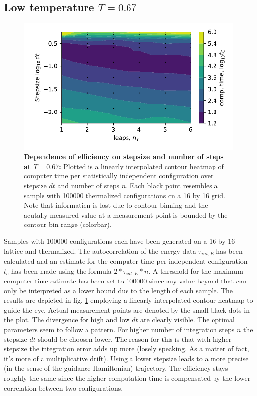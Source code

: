 \documentclass[11pt, a4paper]{scrartcl}
\begin{document}
\subsection{Low temperature $T = 0.67$}
    \begin{figure}
    \begin{centering}
        \includegraphics{low_T.pdf}
        \caption{\textbf{Dependence of efficiency on stepsize and number of steps at $T = 0.67$: } Plotted is a linearly interpolated contour heatmap of computer time per statistically independent configuration over stepsize $dt$ and number of steps $n$. Each black point resembles a sample with 100000 thermalized configurations on a 16 by 16 grid. Note that information is lost due to contour binning and the acutally measured value at a measurement point is bounded by the contour bin range (colorbar).}
    \end{centering}
    \label{lowT}
    \end{figure}
    Samples with 100000 configurations each have been generated on a 16 by 16 lattice and thermalized. The autocorrelation of the energy data $\tau_{int, E}$ has been calculated and an estimate for the computer time per independent configuration $t_c$ has been made using the formula $2*\tau_{int, E} * n$. A threshold for the maximum computer time estimate has been set to 100000 since any value beyond that can only be interpreted as a lower bound due to the length of each sample. The results are depicted in fig. \ref{lowT} employing a linearly interpolated contour heatmap to guide the eye. Actual measurement points are denoted by the small black dots in the plot. The divergence for high and low $dt$ are clearly visible. The optimal parameters seem to follow a pattern. For higher number of integration steps $n$ the stepsize $dt$ should be choosen lower. The reason for this is that with higher stepsize the integration error adds up more (losely speaking. As a matter of fact, it's more of a multiplicative drift). Using a lower stepsize leads to a more precise (in the sense of the guidance Hamiltonian) trajectory. The efficiency stays roughly the same since the higher computation time is compensated by the lower correlation between two configurations.
\end{document}
